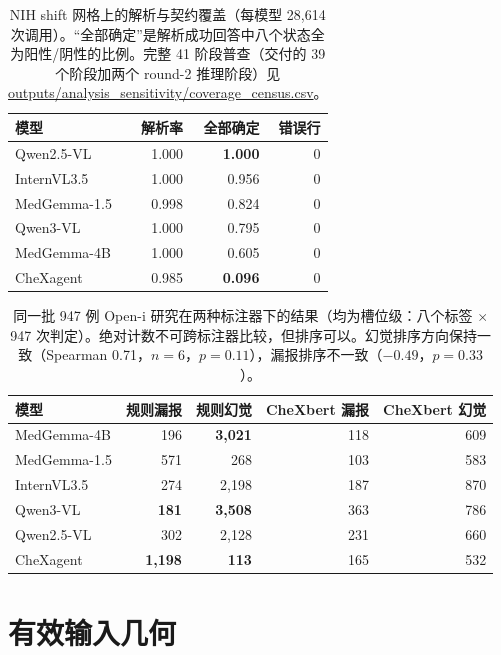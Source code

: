 \begin{table}[H]
\centering
\small
\caption{NIH shift 网格上的解析与契约覆盖（每模型 28,614 次调用）。``全部确定''是解析成功回答中八个状态全为阳性/阴性的比例。完整 41 阶段普查（交付的 39 个阶段加两个 round-2 推理阶段）见 \url{outputs/analysis_sensitivity/coverage_census.csv}。}
\label{tab:coverage}
\begin{tabular}{lrrr}
\toprule
模型 & 解析率 & 全部确定 & 错误行 \\
\midrule
Qwen2.5-VL & 1.000 & \textbf{1.000} & 0 \\
InternVL3.5 & 1.000 & 0.956 & 0 \\
MedGemma-1.5 & 0.998 & 0.824 & 0 \\
Qwen3-VL & 1.000 & 0.795 & 0 \\
MedGemma-4B & 1.000 & 0.605 & 0 \\
CheXagent & 0.985 & \textbf{0.096} & 0 \\
\bottomrule
\end{tabular}
\end{table}

\begin{table}[H]
\centering
\small
\caption{同一批 947 例 Open-i 研究在两种标注器下的结果（均为槽位级：八个标签 $\times$ 947 次判定）。绝对计数不可跨标注器比较，但排序可以。幻觉排序方向保持一致（Spearman 0.71，$n=6$，$p=0.11$），漏报排序不一致（$-0.49$，$p=0.33$）。}
\label{tab:chexbert}
\begin{tabular}{lrrrr}
\toprule
模型 & 规则漏报 & 规则幻觉 & CheXbert 漏报 & CheXbert 幻觉 \\
\midrule
MedGemma-4B & 196 & \textbf{3,021} & 118 & 609 \\
MedGemma-1.5 & 571 & 268 & 103 & 583 \\
InternVL3.5 & 274 & 2,198 & 187 & 870 \\
Qwen3-VL & \textbf{181} & \textbf{3,508} & 363 & 786 \\
Qwen2.5-VL & 302 & 2,128 & 231 & 660 \\
CheXagent & \textbf{1,198} & \textbf{113} & 165 & 532 \\
\bottomrule
\end{tabular}
\end{table}

\section{有效输入几何}
\label{app:geometry}

